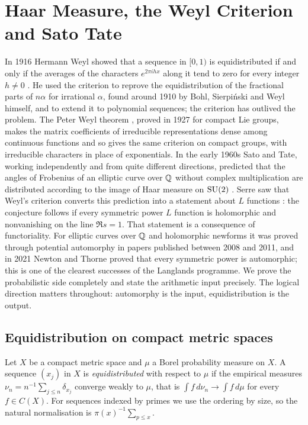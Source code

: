 \chapter{Haar Measure, the Weyl Criterion and Sato Tate}\label{ch:04}

In 1916 Hermann Weyl showed that a sequence in $[0,1)$ is equidistributed if and only if the averages of the characters $e^{2\pi i h x}$ along it tend to zero for every integer $h \neq 0$ \cite{weyl1916}. He used the criterion to reprove the equidistribution of the fractional parts of $n\alpha$ for irrational $\alpha$, found around 1910 by Bohl, Sierpi\'nski and Weyl himself, and to extend it to polynomial sequences; the criterion has outlived the problem. The Peter Weyl theorem \cite{peterweyl1927}, proved in 1927 for compact Lie groups, makes the matrix coefficients of irreducible representations dense among continuous functions and so gives the same criterion on compact groups, with irreducible characters in place of exponentials. In the early 1960s Sato and Tate, working independently and from quite different directions, predicted that the angles of Frobenius of an elliptic curve over $\mathbb{Q}$ without complex multiplication are distributed according to the image of Haar measure on $\mathrm{SU}(2)$ \cite{tate1965}. Serre saw that Weyl's criterion converts this prediction into a statement about $L$ functions \cite{serre1968}: the conjecture follows if every symmetric power $L$ function is holomorphic and nonvanishing on the line $\Re s = 1$. That statement is a consequence of functoriality. For elliptic curves over $\mathbb{Q}$ and holomorphic newforms it was proved through potential automorphy in papers published between 2008 and 2011, and in 2021 Newton and Thorne proved that every symmetric power is automorphic; this is one of the clearest successes of the Langlands programme. We prove the probabilistic side completely and state the arithmetic input precisely. The logical direction matters throughout: automorphy is the input, equidistribution is the output.

\section{Equidistribution on compact metric spaces}

Let $X$ be a compact metric space and $\mu$ a Borel probability measure on $X$. A sequence $(x_j)$ in $X$ is \emph{equidistributed} with respect to $\mu$ if the empirical measures $\nu_n = n^{-1}\sum_{j\le n}\delta_{x_j}$ converge weakly to $\mu$, that is $\int f\,d\nu_n \to \int f\,d\mu$ for every $f \in C(X)$. For sequences indexed by primes we use the ordering by size, so the natural normalisation is $\pi(x)^{-1}\sum_{p\le x}$.

